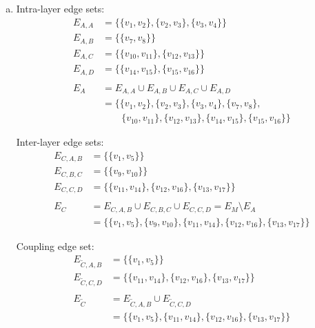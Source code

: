 \documentclass{article}
\begin{document}
    \begin{enumerate}[a)]
        \item Intra-layer edge sets:
        \begin{align*}
            E_{A,A}&=\{\{v_{1},v_{2}\}, \{v_{2},v_{3}\}, \{v_{3},v_{4}\}\} \\
            E_{A,B}&=\{\{v_{7},v_{8}\}\} \\
            E_{A,C}&=\{\{v_{10},v_{11}\},\{v_{12},v_{13}\}\} \\
            E_{A,D}&=\{\{v_{14},v_{15}\},\{v_{15},v_{16}\}\} \\ \\
            E_{A}&= E_{A,A} \cup E_{A,B} \cup E_{A,C} \cup E_{A,D} \\
            &= \{\{v_{1},v_{2}\}, \{v_{2},v_{3}\}, \{v_{3},v_{4}\},\{v_{7},v_{8}\},\\ &\quad\quad\{v_{10},v_{11}\},\{v_{12},v_{13}\},\{v_{14},v_{15}\},\{v_{15},v_{16}\}\}
        \end{align*}
        
        \par\noindent Inter-layer edge sets:
        \begin{align*}
            E_{C,A,B}&=\{\{v_{1},v_{5}\}\} \\
            E_{C,B,C}&=\{\{v_{9},v_{10}\}\} \\
            E_{C,C,D}&=\{\{v_{11},v_{14}\}, \{v_{12},v_{16}\},\{v_{13},v_{17}\}\} \\ \\
            E_{C}&=E_{C,A,B} \cup E_{C,B,C} \cup E_{C,C,D} = E_{M} \setminus E_{A} \\
            &= \{\{v_{1},v_{5}\},\{v_{9},v_{10}\},\{v_{11},v_{14}\}, \{v_{12},v_{16}\}, \{v_{13},v_{17}\}\}
        \end{align*}
        
        \par\noindent Coupling edge set:
        \begin{align*}
            E_{\widetilde{C},A,B}&=\{\{v_{1},v_{5}\}\} \\
            E_{\widetilde{C},C,D}&=\{\{v_{11},v_{14}\}, \{v_{12},v_{16}\}, \{v_{13},v_{17}\}\} \\ \\
            E_{\widetilde{C}}&=E_{\widetilde{C},A,B} \cup E_{\widetilde{C},C,D} \\ &=\{\{v_{1},v_{5}\},\{v_{11},v_{14}\}, \{v_{12},v_{16}\}, \{v_{13},v_{17}\}\}
        \end{align*}
        

\end{enumerate}
\end{document}
